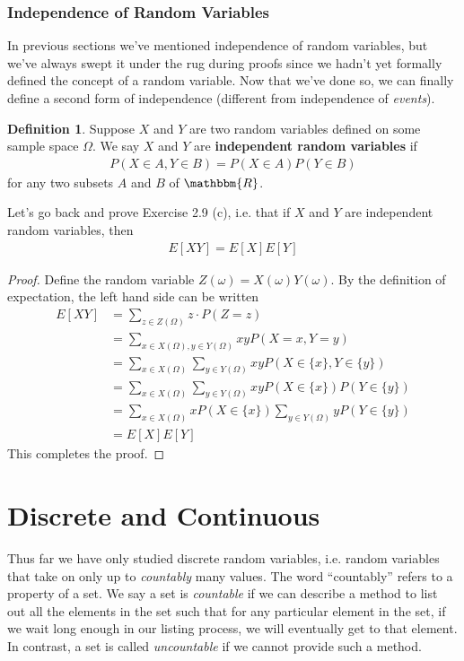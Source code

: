 \documentclass{tufte-book}
\newcommand\real{\mathbbm{R}}
\theoremstyle{definition}
\numberwithin{theorem}{section}
\newtheorem{definition}[theorem]{Definition}
\numberwithin{definition}{section}
\numberwithin{lemma}{section}
\numberwithin{corollary}{section}
\numberwithin{proposition}{section}
\numberwithin{remark}{section}
\numberwithin{claim}{section}
\numberwithin{observation}{section}
\numberwithin{fact}{section}
\numberwithin{assumption}{section}
\numberwithin{example}{section}
\numberwithin{exercise}{section}
\begin{document}
\subsection{Independence of Random Variables}
In previous sections we've mentioned independence of random variables, but we've always swept it under the rug during proofs since we hadn't yet formally defined the concept of a random variable. Now that we've done so, we can finally define a second form of independence (different from independence of \textit{events}).
\begin{definition}
Suppose $X$ and $Y$ are two random variables defined on some sample space $\Omega$. We say $X$ and $Y$ are \textbf{independent random variables} if 
\begin{align*}
P(X \in A, Y \in B) = P(X \in A) P(Y \in B)
\end{align*}
for any two subsets $A$ and $B$ of $\real$.
\end{definition}
Let's go back and prove Exercise 2.9 (c), i.e. that if $X$ and $Y$ are independent random variables, then
\begin{align*}
E[XY] = E[X]E[Y]
\end{align*}
\begin{proof}
Define the random variable $Z(\omega) = X(\omega) Y(\omega)$. By the definition of expectation, the left hand side can be written
\begin{align*}
E[XY] &= \sum_{z \in Z(\Omega)} z \cdot P(Z = z) \\
&= \sum_{x \in X(\Omega), y \in Y(\Omega)} xy P(X = x, Y = y) \\
&= \sum_{x \in X(\Omega)} \sum_{y \in Y(\Omega)} xy P(X \in \{x\}, Y \in \{y\}) \\
&= \sum_{x \in X(\Omega)} \sum_{y \in Y(\Omega)} xy P(X \in \{x\})P(Y \in \{y\}) \\
&= \sum_{x \in X(\Omega)} x P(X \in \{x\}) \sum_{y \in Y(\Omega)} yP(Y \in \{y\}) \\
&= E[X]E[Y]
\end{align*}
This completes the proof.
\end{proof}

\chapter{Discrete and Continuous}

Thus far we have only studied discrete random variables, i.e. random variables that take on only up to \textit{countably} many values. The word ``countably'' refers to a property of a set. We say a set is \textit{countable} if we can describe a method to list out all the elements in the set such that for any particular element in the set, if we wait long enough in our listing process, we will eventually get to that element. In contrast, a set is called \textit{uncountable} if we cannot provide such a method. 
\end{document}
